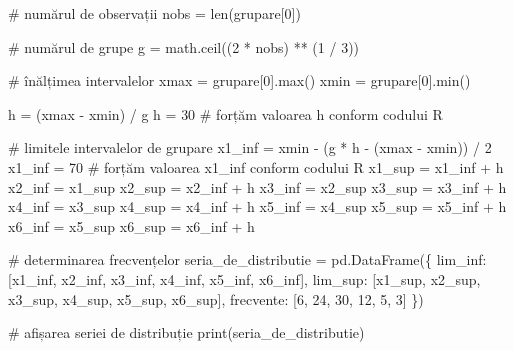 \documentclass[
  11pt,
  b5paper,
  nottoc]{book}
\newenvironment{Shaded}{\begin{snugshade}}{\end{snugshade}}
\newcommand{\BuiltInTok}[1]{\textcolor[rgb]{0.00,0.23,0.31}{#1}}
\newcommand{\CommentTok}[1]{\textcolor[rgb]{0.37,0.37,0.37}{#1}}
\newcommand{\DecValTok}[1]{\textcolor[rgb]{0.68,0.00,0.00}{#1}}
\newcommand{\NormalTok}[1]{\textcolor[rgb]{0.00,0.23,0.31}{#1}}
\newcommand{\OperatorTok}[1]{\textcolor[rgb]{0.37,0.37,0.37}{#1}}
\newcommand{\StringTok}[1]{\textcolor[rgb]{0.13,0.47,0.30}{#1}}
\begin{document}
\begin{Shaded}
\begin{Highlighting}[]
\CommentTok{\# numărul de observații}
\NormalTok{nobs }\OperatorTok{=} \BuiltInTok{len}\NormalTok{(grupare[}\DecValTok{0}\NormalTok{])}

\CommentTok{\# numărul de grupe}
\NormalTok{g }\OperatorTok{=}\NormalTok{ math.ceil((}\DecValTok{2} \OperatorTok{*}\NormalTok{ nobs) }\OperatorTok{**}\NormalTok{ (}\DecValTok{1} \OperatorTok{/} \DecValTok{3}\NormalTok{))}

\CommentTok{\# înălțimea intervalelor}
\NormalTok{xmax }\OperatorTok{=}\NormalTok{ grupare[}\DecValTok{0}\NormalTok{].}\BuiltInTok{max}\NormalTok{()}
\NormalTok{xmin }\OperatorTok{=}\NormalTok{ grupare[}\DecValTok{0}\NormalTok{].}\BuiltInTok{min}\NormalTok{()}

\NormalTok{h }\OperatorTok{=}\NormalTok{ (xmax }\OperatorTok{{-}}\NormalTok{ xmin) }\OperatorTok{/}\NormalTok{ g}
\NormalTok{h }\OperatorTok{=} \DecValTok{30}  \CommentTok{\# forțăm valoarea h conform codului R}

\CommentTok{\# limitele intervalelor de grupare}
\NormalTok{x1\_inf }\OperatorTok{=}\NormalTok{ xmin }\OperatorTok{{-}}\NormalTok{ (g }\OperatorTok{*}\NormalTok{ h }\OperatorTok{{-}}\NormalTok{ (xmax }\OperatorTok{{-}}\NormalTok{ xmin)) }\OperatorTok{/} \DecValTok{2}
\NormalTok{x1\_inf }\OperatorTok{=} \DecValTok{70}  \CommentTok{\# forțăm valoarea x1\_inf conform codului R}
\NormalTok{x1\_sup }\OperatorTok{=}\NormalTok{ x1\_inf }\OperatorTok{+}\NormalTok{ h}
\NormalTok{x2\_inf }\OperatorTok{=}\NormalTok{ x1\_sup}
\NormalTok{x2\_sup }\OperatorTok{=}\NormalTok{ x2\_inf }\OperatorTok{+}\NormalTok{ h}
\NormalTok{x3\_inf }\OperatorTok{=}\NormalTok{ x2\_sup}
\NormalTok{x3\_sup }\OperatorTok{=}\NormalTok{ x3\_inf }\OperatorTok{+}\NormalTok{ h}
\NormalTok{x4\_inf }\OperatorTok{=}\NormalTok{ x3\_sup}
\NormalTok{x4\_sup }\OperatorTok{=}\NormalTok{ x4\_inf }\OperatorTok{+}\NormalTok{ h}
\NormalTok{x5\_inf }\OperatorTok{=}\NormalTok{ x4\_sup}
\NormalTok{x5\_sup }\OperatorTok{=}\NormalTok{ x5\_inf }\OperatorTok{+}\NormalTok{ h}
\NormalTok{x6\_inf }\OperatorTok{=}\NormalTok{ x5\_sup}
\NormalTok{x6\_sup }\OperatorTok{=}\NormalTok{ x6\_inf }\OperatorTok{+}\NormalTok{ h}

\CommentTok{\# determinarea frecvențelor}
\NormalTok{seria\_de\_distributie }\OperatorTok{=}\NormalTok{ pd.DataFrame(\{}
    \StringTok{\textquotesingle{}lim\_inf\textquotesingle{}}\NormalTok{: [x1\_inf, x2\_inf, x3\_inf, x4\_inf, x5\_inf, x6\_inf],}
    \StringTok{\textquotesingle{}lim\_sup\textquotesingle{}}\NormalTok{: [x1\_sup, x2\_sup, x3\_sup, x4\_sup, x5\_sup, x6\_sup],}
    \StringTok{\textquotesingle{}frecvente\textquotesingle{}}\NormalTok{: [}\DecValTok{6}\NormalTok{, }\DecValTok{24}\NormalTok{, }\DecValTok{30}\NormalTok{, }\DecValTok{12}\NormalTok{, }\DecValTok{5}\NormalTok{, }\DecValTok{3}\NormalTok{]}
\NormalTok{\})}

\CommentTok{\# afișarea seriei de distribuție}
\BuiltInTok{print}\NormalTok{(seria\_de\_distributie)}
\end{Highlighting}
\end{Shaded}
\end{document}
